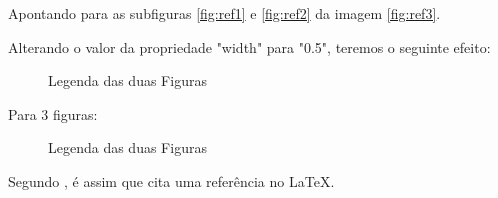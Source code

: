             Apontando para as subfiguras \ref{fig:ref1} e \ref{fig:ref2} da imagem \ref{fig:ref3}.


            Alterando o valor da propriedade "width" para "0.5", teremos o seguinte efeito:
            \begin{figure}[H]
                \centering
                \hfill
                \caption{Legenda das duas Figuras}
                \label{fig:ref6}
            \end{figure}      

            Para 3 figuras:
        
            \begin{figure}[H]
                \centering
                \hfill
                \hfill
                \caption{Legenda das duas Figuras}
                \label{fig:ref10}
            \end{figure}
            
        

Segundo \cite{sobrenome_id}, é assim que cita uma referência no \LaTeX.

\label{cap1}
\label{cap2}
\label{cap3}



